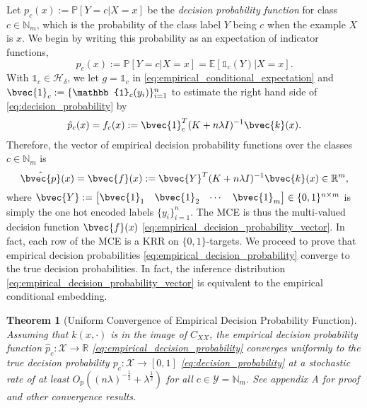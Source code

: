 \documentclass[twoside]{article}
\newtheorem{theorem}{Theorem}[section]
\begin{document}
		Let $p_{c}(x) := \mathbb{P}[Y = c | X = x]$ be the \textit{decision probability function} for class $c \in \mathbb{N}_{m}$, which is the probability of the class label $Y$ being $c$ when the example $X$ is $x$. We begin by writing this probability as an expectation of indicator functions,
		\begin{equation}
		p_{c}(x) := \mathbb{P}[Y = c | X = x] = \mathbb{E}[\mathbb{1}_{c}(Y) | X = x].
		\label{eq:decision_probability}
		\end{equation}	
		With $\mathbb{1}_{c} \in \mathcal{H}_{\delta}$, we let $g = \mathbb{1}_{c}$ in \eqref{eq:empirical_conditional_expectation} and $\bvec{1}_{c} := \{\mathbb{1}_{c}(y_{i})\}_{i = 1}^{n}$ to estimate the right hand side of \eqref{eq:decision_probability} by
		\begin{equation}
		\hat{p}_{c}(x) = f_{c}(x) := \bvec{1}_{c}^{T} (K + n \lambda I)^{-1} \bvec{k}(x).
		\label{eq:empirical_decision_probability}
		\end{equation}
		Therefore, the vector of empirical decision probability functions over the classes $c \in \mathbb{N}_{m}$ is
		\begin{equation}
		\hat{\bvec{p}}(x) = \bvec{f}(x) := \bvec{Y}^{T} (K + n \lambda I)^{-1} \bvec{k}(x) \in \mathbb{R}^{m},
		\label{eq:empirical_decision_probability_vector}
		\end{equation}
		where $\bvec{Y} := \begin{bmatrix} \bvec{1}_{1} & \bvec{1}_{2} & \cdots & \bvec{1}_{m} \end{bmatrix} \in \{0, 1\}^{n \times m}$ is simply the one hot encoded labels $\{y_{i}\}_{i = 1}^{n}$. The \gls{MCE} is thus the multi-valued decision function $\bvec{f}(x)$ \eqref{eq:empirical_decision_probability_vector}. In fact, each row of the \gls{MCE} is a \gls{KRR} \citep{friedman2001elements} on $\{0, 1\}$-targets. We proceed to prove that empirical decision probabilities \eqref{eq:empirical_decision_probability} converge to the true decision probabilities. In fact, the inference distribution \eqref{eq:empirical_decision_probability_vector} is equivalent to the empirical conditional embedding.
		\begin{theorem}[Uniform Convergence of Empirical Decision Probability Function]
			\label{thm:probability_convergence_copy}
			Assuming that $k(x, \cdot)$ is in the image of $C_{XX}$, the empirical decision probability function $\hat{p}_{c} : \mathcal{X} \to \mathbb{R}$ \eqref{eq:empirical_decision_probability} converges uniformly to the true decision probability $p_{c} : \mathcal{X} \to [0, 1]$ \eqref{eq:decision_probability} at a stochastic rate of at least $O_{p}((n \lambda)^{-\frac{1}{2}} + \lambda^{\frac{1}{2}})$ for all $c \in \mathcal{Y} = \mathbb{N}_{m}$. See appendix A for proof and other convergence results.
		\end{theorem}
		
\end{document}

